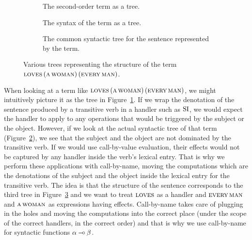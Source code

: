 \begin{figure}
  \begin{subfigure}[b]{.25\textwidth}
  \caption{\label{fig:second-order-tree} The second-order term as a tree.}
  \end{subfigure}
  \begin{subfigure}[b]{.49\textwidth}
  \caption{\label{fig:abstract-syntax-tree} The syntax of the term as a
    tree.}
  \end{subfigure}
  \begin{subfigure}[b]{.25\textwidth}
  \caption{\label{fig:common-syntax-tree} The common syntactic tree for the
    sentence represented by the term.}
  \end{subfigure}

  \caption{\label{fig:cbn-cbv-trees} Various trees representing the
    structure of the term
    $\textsc{loves}\,(\textsc{a}\,\textsc{woman})\,(\textsc{every}\,\textsc{man})$.}
\end{figure}

When looking at a term like
$\textsc{loves}\,(\textsc{a}\,\textsc{woman})\,(\textsc{every}\,\textsc{man})$,
we might intuitively picture it as the tree in
Figure~\ref{fig:second-order-tree}. If we wrap the denotation of the
sentence produced by a transitive verb in a handler such as $\operatorname{SI}$, we would
expect the handler to apply to any operations that would be triggered by
the subject or the object. However, if we look at the actual syntactic tree
of that term (Figure~\ref{fig:abstract-syntax-tree}), we see that the
subject and the object are not dominated by the transitive verb. If we
would use call-by-value evaluation, their effects would not be captured by
any handler inside the verb's lexical entry. That is why we perform these
applications with call-by-name, moving the computations which are the
denotations of the subject and the object inside the lexical entry for the
transitive verb. The idea is that the structure of the sentence corresponds
to the third tree in Figure~\ref{fig:common-syntax-tree} and we want to
treat $\textsc{loves}$ as a handler and $\textsc{every}\,\textsc{man}$ and
$\textsc{a}\,\textsc{woman}$ as expressions having effects. Call-by-name
takes care of plugging in the holes and moving the computations into the
correct place (under the scope of the correct handlers, in the correct
order) and that is why we use call-by-name for syntactic functions
$\alpha \mathbin{{-}\mkern-3.5mu{\circ}} \beta$.

